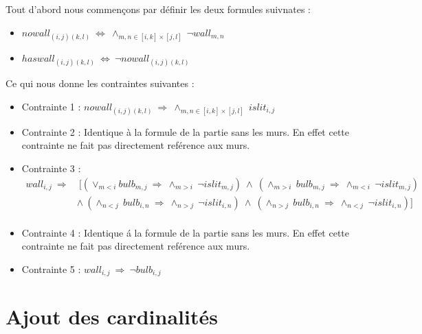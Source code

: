 \documentclass{article}
\begin{document}
Tout d'abord nous commençons par d\'efinir les deux formules suivnates :
\begin{itemize}
\item $ nowall_{(i,j)(k,l)} ~ \Leftrightarrow ~ \wedge_{m,n \in [i,k]\times[j,l]} ~ \neg wall_{m,n} $
\item $ haswall_{(i,j)(k,l)} ~ \Leftrightarrow ~ \neg nowall_{(i,j)(k,l)} $\\
\end{itemize}
Ce qui nous donne les contraintes suivantes :
\begin{itemize}
\item Contrainte 1 : $ nowall_{(i,j)(k,l)} ~ \Rightarrow ~ \wedge_{m,n \in [i,k]\times[j,l]} ~ islit_{i,j} $
\item Contrainte 2 : Identique \`a la formule de la partie sans les murs. En effet cette contrainte ne fait pas directement ref\'erence aux murs.
\item Contrainte 3 :
\begin{align}
\nonumber
 wall_{i,j} ~ \Rightarrow &~ [(\vee_{m<i}bulb_{m,j} ~ \Rightarrow ~ \wedge_{m>i} ~ \neg islit_{m,j})~\wedge ~ (\wedge_{m>i} ~ bulb_{m,j} ~ \Rightarrow ~ \wedge_{m<i} ~ \neg islit_{m,j})\\
\nonumber
& \wedge ~ (\wedge_{n<j} ~ bulb_{i,n} ~ \Rightarrow ~ \wedge_{n>j} ~ \neg islit_{i,n})~ \wedge ~ (\wedge_{n>j} ~ bulb_{i,n} ~ \Rightarrow ~ \wedge_{n<j} ~ \neg islit_{i,n})]\\
\nonumber
\end{align}
\item Contrainte 4 : Identique \'a la formule de la partie sans les murs. En effet cette contrainte ne fait pas directement ref\'erence aux murs.
\item Contrainte 5 : $ wall_{i,j} ~ \Rightarrow ~ \neg bulb_{i,j} $
\end{itemize}

\section{Ajout des cardinalit\'es}
\end{document}
